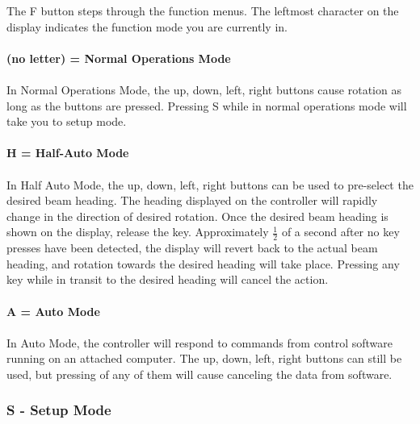 \documentclass[11pt]{article} %
\begin{document}
The F button steps through the function menus. The leftmost character on the display indicates the function mode you are currently in.
\\ \\
\textbf{(no letter) = Normal Operations Mode}
\\ \\
In Normal Operations Mode, the up, down, left, right buttons cause rotation as long as the buttons are pressed. Pressing S while in normal operations mode will take you to setup mode.
\\ \\
\textbf{H = Half-Auto Mode}
\\ \\
In Half Auto Mode, the up, down, left, right buttons can be used to pre-select the desired beam heading. The heading displayed on the controller will rapidly change in the direction of desired rotation. Once the desired beam heading is shown on the display, release the key. Approximately $\frac{1}{2}$ of a second after no key presses have been detected, the display will revert back to the actual beam heading, and rotation towards the desired heading will take place. Pressing any key while in transit to the desired heading will cancel the action.
\\ \\
\textbf{A = Auto Mode}
\\ \\
In Auto Mode, the controller will respond to commands from control software running on an attached computer. The up, down, left, right buttons can still be used, but pressing of any of them will cause canceling the data from software.

\subsubsection{S - Setup Mode}
\end{document}
